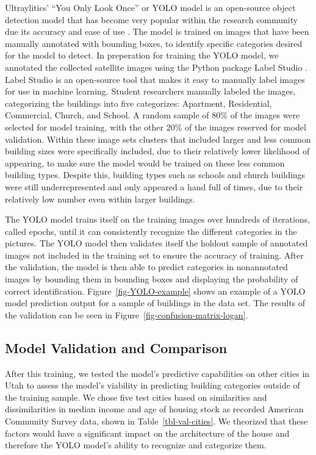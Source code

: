 \documentclass[conference,]{IEEEtran}
\begin{document}
Ultraylitics' ``You Only Look Once'' or YOLO model is an open-source
object detection model that has become very popular within the research
community due its accuracy and ease of use
\autocite{Jocher_Ultralytics_YOLO_2023}. The model is trained on images
that have been manually annotated with bounding boxes, to identify
specific categories desired for the model to detect. In preperation for
training the YOLO model, we annotated the collected satellite images
using the Python package Label Studio \autocite{Label_Studio}. Label
Studio is an open-source tool that makes it easy to manually label
images for use in machine learning. Student researchers manually labeled
the images, categorizing the buildings into five categorizes: Apartment,
Residential, Commercial, Church, and School. A random sample of 80\% of
the images were selected for model training, with the other 20\% of the
images reserved for model validation. Within these image sets clusters
that included larger and less common building sizes were specifically
included, due to their relatively lower likelihood of appearing, to make
sure the model would be trained on these less common building types.
Despite this, building types such as schools and church buildings were
still underrepresented and only appeared a hand full of times, due to
their relatively low number even within larger buildings.

The YOLO model trains itself on the training images over hundreds of
iterations, called epochs, until it can consistently recognize the
different categories in the pictures. The YOLO model then validates
itself the holdout sample of annotated images not included in the
training set to ensure the accuracy of training. After the validation,
the model is then able to predict categories in nonannotated images by
bounding them in bounding boxes and displaying the probability of
correct identification. Figure~\ref{fig-YOLO-example} shows an example
of a YOLO model prediction output for a sample of buildings in the data
set. The results of the validation can be seen in
Figure~\ref{fig-confusion-matrix-logan}.

\subsection{Model Validation and
Comparison}\label{model-validation-and-comparison}

After this training, we tested the model's predictive capabilities on
other cities in Utah to assess the model's viability in predicting
building categories outside of the training sample. We chose five test
cities based on similarities and dissimilarities in median income and
age of housing stock as recorded American Community Survey data, shown
in Table~\ref{tbl-val-cities}. We theorized that these factors would
have a significant impact on the architecture of the house and therefore
the YOLO model's ability to recognize and categorize them.
\end{document}
